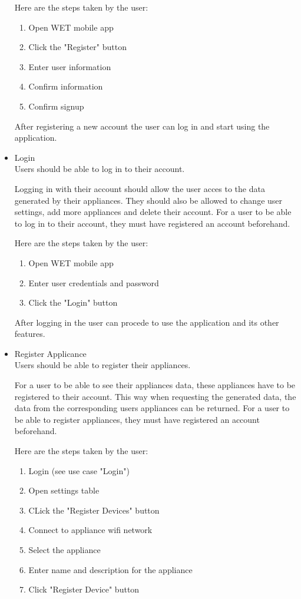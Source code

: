 \documentclass[10pt]{article}
\begin{document}
\begin{multicols*}{2}
\begin{itemize}
  Here are the steps taken by the user:
  \begin{enumerate}
    \item Open WET mobile app
    \item Click the "Register" button
    \item Enter user information
    \item Confirm information
    \item Confirm signup
  \end{enumerate}

  After registering a new account the user can log in and start using the application.
  
  \item {Login} \\
  Users should be able to log in to their account.

  Logging in with their account should allow the user acces to the data generated by their appliances. They should also be allowed to change user settings, add more appliances and delete their account.
  For a user to be able to log in to their account, they must have registered an account beforehand.
 
  Here are the steps taken by the user:
  \begin{enumerate}
    \item Open WET mobile app
    \item Enter user credentials and password
    \item Click the "Login" button
  \end{enumerate}

  After logging in the user can procede to use the application and its other features.

  \item {Register Applicance} \\
  Users should be able to register their appliances.

  For a user to be able to see their appliances data, these appliances have to be registered to their account. This way when requesting the generated data, the data from the corresponding users appliances can be returned.
  For a user to be able to register appliances, they must have registered an account beforehand.
  
  Here are the steps taken by the user:
  \begin{enumerate}
    \item Login (see use case "Login")
    \item Open settings table
    \item CLick the "Register Devices" button
    \item Connect to appliance wifi network
    \item Select the appliance
    \item Enter name and description for the appliance
    \item Click "Register Device" button
  \end{enumerate}


\end{itemize}
\end{multicols*}
\end{document}
